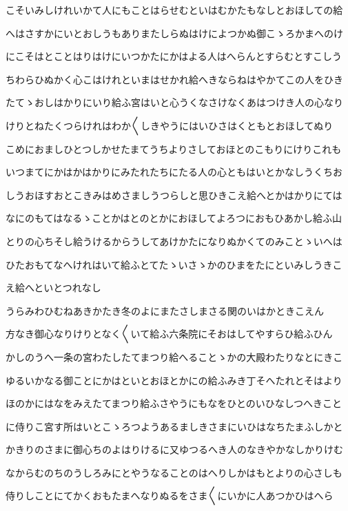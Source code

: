 \documentclass[a4paper,11pt,landscape]{ltjtarticle}
\begin{document}
\par\medskip
こそいみしけれいかて人にもことはらせむといはむかたもなしとおほしての給
\par\medskip
へはさすかにいとおしうもありまたしらぬはけによつかぬ御こゝろかまへのけ
\par\medskip
にこそはとことはりはけにいつかたにかはよる人はへらんとすらむとすこしう
\par\medskip
ちわらひぬかく心こはけれといまはせかれ給へきならねはやかてこの人をひき
\par\medskip
たてゝおしはかりにいり給ふ宮はいと心うくなさけなくあはつけき人の心なり
\par\medskip
けりとねたくつらけれはわか〱しきやうにはいひさはくともとおほしてぬり
\par\medskip
こめにおましひとつしかせたまてうちよりさしておほとのこもりにけりこれも
\par\medskip
いつまてにかはかはかりにみたれたちにたる人の心ともはいとかなしうくちお
\par\medskip
しうおほすおとこきみはめさましうつらしと思ひきこえ給へとかはかりにては
\par\medskip
なにのもてはなるゝことかはとのとかにおほしてよろつにおもひあかし給ふ山
\par\medskip
とりの心ちそし給うけるからうしてあけかたになりぬかくてのみことゝいへは
\par\medskip
ひたおもてなへけれはいて給ふとてたゝいさゝかのひまをたにといみしうきこ
\par\medskip
え給へといとつれなし
\par\medskip
うらみわひむねあきかたき冬のよにまたさしまさる関のいはかときこえん
\par\medskip
方なき御心なりけりとなく〱いて給ふ六条院にそおはしてやすらひ給ふひん
\par\medskip
かしのうへ一条の宮わたしたてまつり給へることゝかの大殿わたりなとにきこ
\par\medskip
ゆるいかなる御ことにかはといとおほとかにの給ふみき丁そへたれとそはより
\par\medskip
ほのかにはなをみえたてまつり給ふさやうにもなをひとのいひなしつへきこと
\par\medskip
に侍りこ宮す所はいとこゝろつようあるましきさまにいひはなちたまふしかと
\par\medskip
かきりのさまに御心ちのよはりけるに又ゆつるへき人のなきやかなしかりけむ
\par\medskip
なからむのちのうしろみにとやうなることのはへりしかはもとよりの心さしも
\par\medskip
侍りしことにてかくおもたまへなりぬるをさま〱にいかに人あつかひはへら
\end{document}
